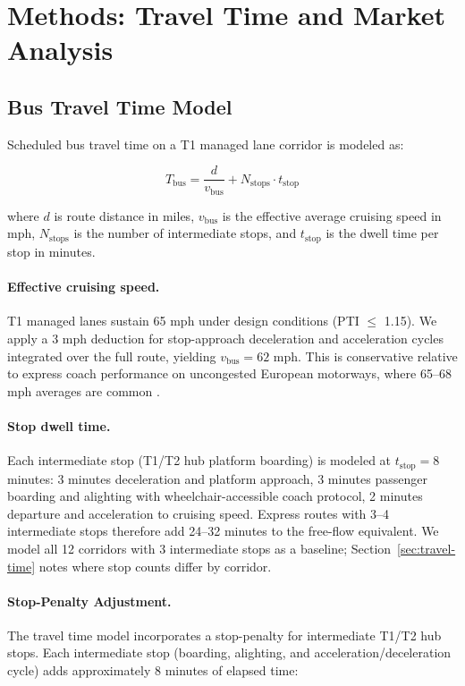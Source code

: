 \section{Methods: Travel Time and Market Analysis}
\label{sec:methods}

\subsection{Bus Travel Time Model}

Scheduled bus travel time on a T1 managed lane corridor is modeled as:

\begin{equation}
  T_{\text{bus}} = \frac{d}{v_{\text{bus}}} + N_{\text{stops}} \cdot t_{\text{stop}}
  \label{eq:travel-time}
\end{equation}

where $d$ is route distance in miles, $v_{\text{bus}}$ is the effective average cruising speed in mph, $N_{\text{stops}}$ is the number of intermediate stops, and $t_{\text{stop}}$ is the dwell time per stop in minutes.

\paragraph{Effective cruising speed.} T1 managed lanes sustain 65 mph under design conditions (PTI $\leq$ 1.15). We apply a 3 mph deduction for stop-approach deceleration and acceleration cycles integrated over the full route, yielding $v_{\text{bus}} = 62$ mph. This is conservative relative to express coach performance on uncongested European motorways, where 65--68 mph averages are common \citep{FlixBus2023}.

\paragraph{Stop dwell time.} Each intermediate stop (T1/T2 hub platform boarding) is modeled at $t_{\text{stop}} = 8$ minutes: 3 minutes deceleration and platform approach, 3 minutes passenger boarding and alighting with wheelchair-accessible coach protocol, 2 minutes departure and acceleration to cruising speed. Express routes with 3--4 intermediate stops therefore add 24--32 minutes to the free-flow equivalent. We model all 12 corridors with 3 intermediate stops as a baseline; Section~\ref{sec:travel-time} notes where stop counts differ by corridor.

\paragraph{Stop-Penalty Adjustment.}
The travel time model incorporates a stop-penalty for intermediate T1/T2 hub stops.
Each intermediate stop (boarding, alighting, and acceleration/deceleration cycle)
adds approximately 8 minutes of elapsed time:

